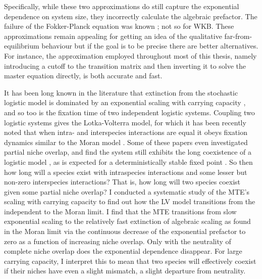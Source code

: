 Specifically, while these two approximations do still capture the exponential dependence on system size, they incorrectly calculate the algebraic prefactor. 
The failure of the Fokker-Planck equation was known \cite{Grasman1983,Doering2005}; not so for WKB. 
These approximations remain appealing for getting an idea of the qualitative far-from-equilibrium behaviour but if the goal is to be precise there are better alternatives. 
For instance, the approximation employed throughout most of this thesis, namely introducing a cutoff to the transition matrix and then inverting it to solve the master equation directly, is both accurate and fast. 

It has been long known in the literature that extinction from the stochastic logistic model is dominated by an exponential scaling with carrying capacity \cite{Norden1982,Kamenev2008,Assaf2010,Ovaskainen2010}, and so too is the fixation time of two independent logistic systems. 
Coupling two logistic systems gives the Lotka-Volterra model, for which it has been recently noted that when intra- and interspecies interactions are equal it obeys fixation dynamics similar to the Moran model \cite{Lin2012,Constable2015,Chotibut2015,Young2018}. 
Some of these papers even investigated partial niche overlap, and find the system still exhibits the long coexistence of a logistic model \cite{which of them?}, as is expected for a deterministically stable fixed point \cite{Hanggi1990}. %
So then how long will a species exist with intraspecies interactions and some lesser but non-zero interspecies interactions? That is, how long will two species coexist given some partial niche overlap? 
I conducted a systematic study of the MTE's scaling with carrying capacity to find out how the LV model transitions from the independent to the Moran limit. 
I find that the MTE transitions from slow exponential scaling to the relatively fast extinction of algebraic scaling as found in the Moran limit via the continuous decrease of the exponential prefactor to zero as a function of increasing niche overlap. 
Only with the neutrality of complete niche overlap does the exponential dependence disappear. 
For large carrying capacity, I interpret this to mean that two species will effectively coexist if their niches have even a slight mismatch, a slight departure from neutrality. %

